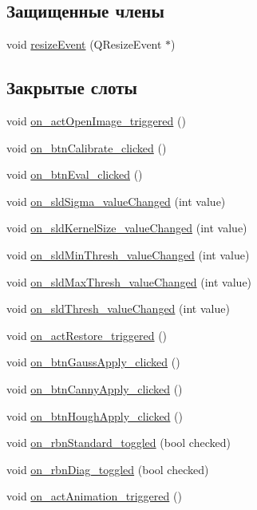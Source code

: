 \subsection*{Защищенные члены}
\begin{DoxyCompactItemize}
\item 
void \hyperlink{class_main_window_a8851a931482834eeec527490eedaf20e}{resize\+Event} (Q\+Resize\+Event $\ast$)
\end{DoxyCompactItemize}
\subsection*{Закрытые слоты}
\begin{DoxyCompactItemize}
\item 
void \hyperlink{class_main_window_a444b28f9a298e9e256411f3b428f360c}{on\+\_\+act\+Open\+Image\+\_\+triggered} ()
\item 
void \hyperlink{class_main_window_aa8d88789d920fe1a8094bf0124375e37}{on\+\_\+btn\+Calibrate\+\_\+clicked} ()
\item 
void \hyperlink{class_main_window_ad73256a4d549f57499a168d4ecb29731}{on\+\_\+btn\+Eval\+\_\+clicked} ()
\item 
void \hyperlink{class_main_window_a42f92b00e3336f2efec873fdcb5d612b}{on\+\_\+sld\+Sigma\+\_\+value\+Changed} (int value)
\item 
void \hyperlink{class_main_window_a5f0302c9dadda691baf7db36058dd320}{on\+\_\+sld\+Kernel\+Size\+\_\+value\+Changed} (int value)
\item 
void \hyperlink{class_main_window_a1cd7c221bd2f97f249b13522bcd05aa2}{on\+\_\+sld\+Min\+Thresh\+\_\+value\+Changed} (int value)
\item 
void \hyperlink{class_main_window_a03d260c44d11800d1b6f2653e35bc493}{on\+\_\+sld\+Max\+Thresh\+\_\+value\+Changed} (int value)
\item 
void \hyperlink{class_main_window_adbd6bf1258b5b2b8fd692542f62f0343}{on\+\_\+sld\+Thresh\+\_\+value\+Changed} (int value)
\item 
void \hyperlink{class_main_window_a05932234bd7e1ce4d84a854bd9b1116f}{on\+\_\+act\+Restore\+\_\+triggered} ()
\item 
void \hyperlink{class_main_window_a398b215bc771decd945f2f57755c1378}{on\+\_\+btn\+Gauss\+Apply\+\_\+clicked} ()
\item 
void \hyperlink{class_main_window_a0a67f3153d50bd7b6c460e8cd5bb2f2b}{on\+\_\+btn\+Canny\+Apply\+\_\+clicked} ()
\item 
void \hyperlink{class_main_window_a8475da3b0861fbd81ba3ecdfeabaf706}{on\+\_\+btn\+Hough\+Apply\+\_\+clicked} ()
\item 
void \hyperlink{class_main_window_a566f53b41639cb820cfdd538de49e6c5}{on\+\_\+rbn\+Standard\+\_\+toggled} (bool checked)
\item 
void \hyperlink{class_main_window_a43e6036500db86ce70ce805fadad4676}{on\+\_\+rbn\+Diag\+\_\+toggled} (bool checked)
\item 
void \hyperlink{class_main_window_adbe7e3decb27c0c8120a92c4946d270a}{on\+\_\+act\+Animation\+\_\+triggered} ()
\end{DoxyCompactItemize}
